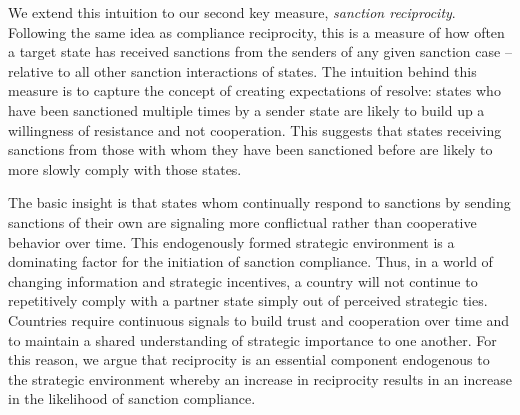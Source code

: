 We extend this intuition to our second key measure, \textit{sanction reciprocity}. Following the same idea as compliance reciprocity, this is a measure of how often a target state has received sanctions from the senders of any given sanction case -- relative to all other sanction interactions of states. The intuition behind this measure is to capture the concept of creating expectations of resolve: states who have been sanctioned multiple times by a sender state are likely to build up a willingness of resistance and not cooperation. This suggests that states receiving sanctions from those with whom they have been sanctioned before are likely to more slowly comply with those states. 

The basic insight is that states whom continually respond to sanctions by sending sanctions of their own are signaling more conflictual rather than cooperative behavior over time. This endogenously formed strategic environment is a dominating factor for the initiation of sanction compliance. Thus, in a world of changing information and strategic incentives, a country will not continue to repetitively comply with a partner state simply out of perceived strategic ties. Countries require continuous signals to build trust and cooperation over time and to maintain a shared understanding of strategic importance to one another. For this reason, we argue that reciprocity is an essential component endogenous to the strategic environment whereby an increase in reciprocity results in an increase in the likelihood of sanction compliance. 

